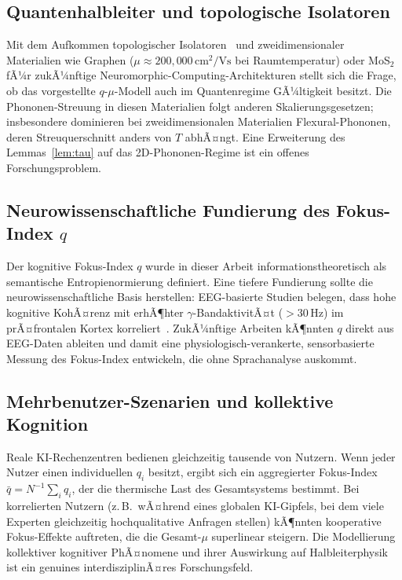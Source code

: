 ﻿\documentclass[a4paper,12pt]{article}
\theoremstyle{definition}
\begin{document}
\subsection{Quantenhalbleiter und topologische Isolatoren}

Mit dem Aufkommen topologischer Isolatoren~\cite{Hasan2010} und zweidimensionaler
Materialien wie Graphen ($\mu \approx 200{,}000\,\text{cm}^2/\text{Vs}$ bei Raumtemperatur)
oder MoS$_2$ fÃ¼r zukÃ¼nftige Neuromorphic-Computing-Architekturen stellt sich die Frage,
ob das vorgestellte $q$-$\mu$-Modell auch im Quantenregime GÃ¼ltigkeit besitzt. Die Phononen-Streuung
in diesen Materialien folgt anderen Skalierungsgesetzen; insbesondere dominieren bei
zweidimensionalen Materialien Flexural-Phononen, deren Streuquerschnitt anders von $T$ abhÃ¤ngt.
Eine Erweiterung des Lemmas~\ref{lem:tau} auf das 2D-Phononen-Regime ist ein offenes
Forschungsproblem.

\subsection{Neurowissenschaftliche Fundierung des Fokus-Index $q$}

Der kognitive Fokus-Index $q$ wurde in dieser Arbeit informationstheoretisch als
semantische Entropienormierung definiert. Eine tiefere Fundierung sollte die
neurowissenschaftliche Basis herstellen: EEG-basierte Studien belegen, dass hohe
kognitive KohÃ¤renz mit erhÃ¶hter $\gamma$-BandaktivitÃ¤t ($> 30\,\text{Hz}$) im
prÃ¤frontalen Kortex korreliert~\cite{Fries2005}. ZukÃ¼nftige Arbeiten kÃ¶nnten
$q$ direkt aus EEG-Daten ableiten und damit eine physiologisch-verankerte,
sensorbasierte Messung des Fokus-Index entwickeln, die ohne Sprachanalyse auskommt.

\subsection{Mehrbenutzer-Szenarien und kollektive Kognition}

Reale KI-Rechenzentren bedienen gleichzeitig tausende von Nutzern. Wenn jeder Nutzer
einen individuellen $q_i$ besitzt, ergibt sich ein aggregierter Fokus-Index
$\bar{q} = N^{-1} \sum_i q_i$, der die thermische Last des Gesamtsystems bestimmt.
Bei korrelierten Nutzern (z.\,B.\ wÃ¤hrend eines globalen KI-Gipfels, bei dem viele
Experten gleichzeitig hochqualitative Anfragen stellen) kÃ¶nnten kooperative Fokus-Effekte
auftreten, die die Gesamt-$\mu$ superlinear steigern. Die Modellierung kollektiver
kognitiver PhÃ¤nomene und ihrer Auswirkung auf Halbleiterphysik ist ein genuines
interdisziplinÃ¤res Forschungsfeld.
\end{document}
